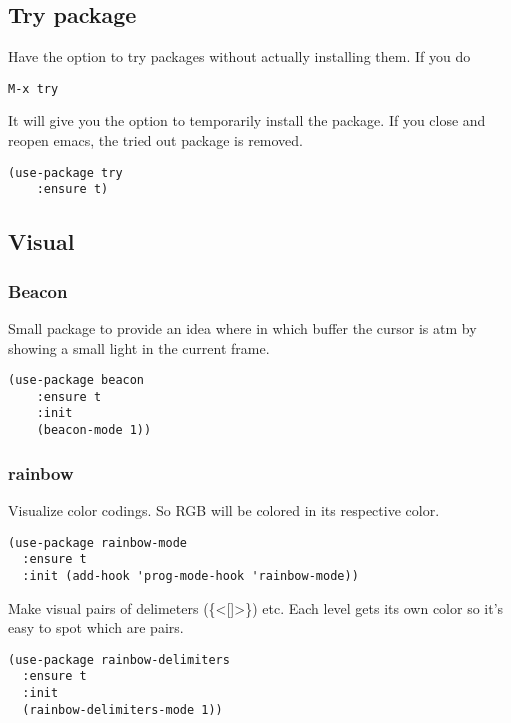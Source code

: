 \documentclass[11pt]{article}
\begin{document}
\subsection{Try package}
\label{sec:orga203eb3}
Have the option to try packages without actually installing them. If you do

\begin{verbatim}
M-x try
\end{verbatim}

It will give you the option to temporarily install the package. If you close and reopen emacs, the tried out package is removed.

\begin{verbatim}
(use-package try
    :ensure t)
\end{verbatim}
\subsection{Visual}
\label{sec:org01f0ef8}
\subsubsection{Beacon}
\label{sec:org5965700}
Small package to provide an idea where in which buffer the cursor is atm by showing a small light in the current frame.
\begin{verbatim}
(use-package beacon
    :ensure t
    :init
    (beacon-mode 1))
\end{verbatim}
\subsubsection{rainbow}
\label{sec:org9628da0}
Visualize color codings. So RGB will be colored in its respective color.
\begin{verbatim}
(use-package rainbow-mode
  :ensure t
  :init (add-hook 'prog-mode-hook 'rainbow-mode))
\end{verbatim}

Make visual pairs of delimeters (\{<[]>\}) etc. Each level gets its own color so it's easy to spot which are pairs.
\begin{verbatim}
(use-package rainbow-delimiters
  :ensure t
  :init
  (rainbow-delimiters-mode 1))
\end{verbatim}
\end{document}
